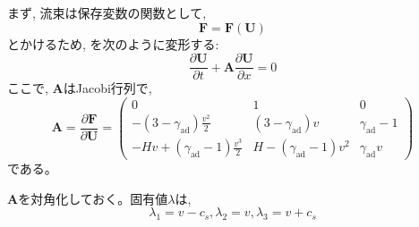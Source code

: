 \documentclass[dvipdfmx,b5paper]{jsarticle}
\begin{document}
まず, 流束は保存変数の関数として, 
\begin{equation}
  \bm{F}=\bm{F}(\bm{U})
\end{equation}
とかけるため, を次のように変形する: 
\begin{equation}
  \frac{\partial \bm{U}}{\partial t}+\bm{A}\frac{\partial \bm{U}}{\partial x}=0
  \label{eqneo}
\end{equation}
ここで, $\bm{A}$はJacobi行列で, 
\begin{equation}
  \bm{A}=\frac{\partial \bm{F}}{\partial \bm{U}}=
  \begin{pmatrix}
    0 & 1 & 0 \\
    -(3-\gamma_{\mathrm{ad}})\frac{v^2}{2} & (3-\gamma_{\mathrm{ad}})v & \gamma_{\mathrm{ad}}-1 \\
    -Hv+(\gamma_{\mathrm{ad}}-1)\frac{v^3}{2} & H-(\gamma_{\mathrm{ad}}-1)v^2 & \gamma_{\mathrm{ad}}v
  \end{pmatrix}
\end{equation}
である。

$\bm{A}$を対角化しておく。固有値$\lambda$は, 
\begin{equation}
  \lambda_1=v-c_s, \lambda_2=v, \lambda_3=v+c_s
\end{equation}
\end{document}
